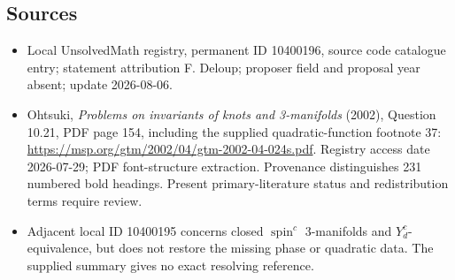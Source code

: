 \documentclass[11pt]{article}
\begin{document}
\subsection{Sources}
\begin{itemize}
\item Local UnsolvedMath registry, permanent ID 10400196, source code catalogue entry; statement attribution F. Deloup; proposer field and proposal year absent; update 2026-08-06.
\item Ohtsuki, \emph{Problems on invariants of knots and 3-manifolds} (2002), Question 10.21, PDF page 154, including the supplied quadratic-function footnote 37: \url{https://msp.org/gtm/2002/04/gtm-2002-04-024s.pdf}. Registry access date 2026-07-29; PDF font-structure extraction. Provenance distinguishes 231 numbered bold headings. Present primary-literature status and redistribution terms require review.
\item Adjacent local ID 10400195 concerns closed \(\operatorname{spin}^c\) 3-manifolds and \(Y_d^c\)-equivalence, but does not restore the missing phase or quadratic data. The supplied summary gives no exact resolving reference.
\end{itemize}
\end{document}
